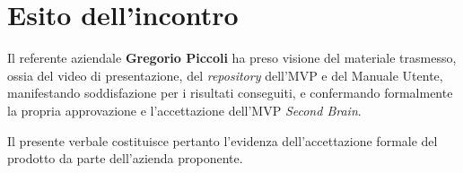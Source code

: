 \documentclass[a4paper, 10pt, colorlinks=true, linkcolor=black, urlcolor=blue, citecolor=blue, hidelinks]{article}
\begin{document}
\section{Esito dell'incontro}

Il referente aziendale \textbf{Gregorio Piccoli} ha preso visione del materiale trasmesso, ossia del video di presentazione, del \textit{repository} dell'MVP e del Manuale Utente, manifestando soddisfazione per i risultati conseguiti, e confermando formalmente la propria approvazione e l'accettazione dell'MVP \textit{Second Brain}.

\vspace{0.3cm}

\noindent Il presente verbale costituisce pertanto l'evidenza dell'accettazione formale del prodotto da parte dell'azienda proponente.
\end{document}

